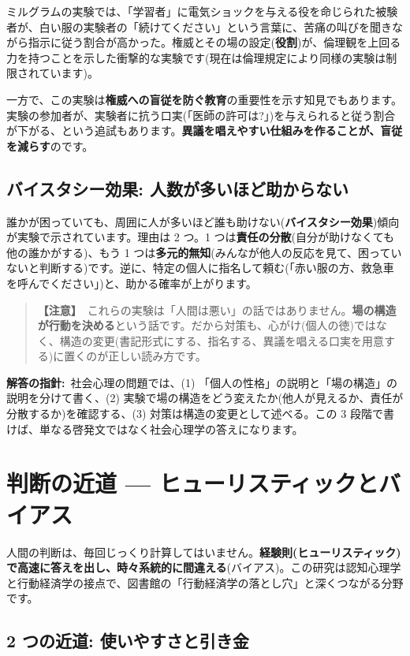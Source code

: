 \documentclass{article}
\begin{document}
ミルグラムの実験では、「学習者」に電気ショックを与える役を命じられた被験者が、白い服の実験者の「続けてください」という言葉に、苦痛の叫びを聞きながら指示に従う割合が高かった。権威とその場の設定(\textbf{役割})が、倫理観を上回る力を持つことを示した衝撃的な実験です(現在は倫理規定により同様の実験は制限されています)。

一方で、この実験は\textbf{権威への盲従を防ぐ教育}の重要性を示す知見でもあります。実験の参加者が、実験者に抗う口実(「医師の許可は?」)を与えられると従う割合が下がる、という追試もあります。\textbf{異議を唱えやすい仕組みを作ることが、盲従を減らす}のです。

\subsection{バイスタシー効果: 人数が多いほど助からない}

誰かが困っていても、周囲に人が多いほど誰も助けない(\textbf{バイスタシー効果})傾向が実験で示されています。理由は 2 つ。1 つは\textbf{責任の分散}(自分が助けなくても他の誰かがする)、もう 1 つは\textbf{多元的無知}(みんなが他人の反応を見て、困っていないと判断する)です。逆に、特定の個人に指名して頼む(「赤い服の方、救急車を呼んでください」)と、助かる確率が上がります。

\begin{quote}
\textbf{【注意】}\ これらの実験は「人間は悪い」の話ではありません。\textbf{場の構造が行動を決める}という話です。だから対策も、心がけ(個人の徳)ではなく、構造の変更(書記形式にする、指名する、異議を唱える口実を用意する)に置くのが正しい読み方です。
\end{quote}

\textbf{解答の指針:}\ 社会心理の問題では、(1) 「個人の性格」の説明と「場の構造」の説明を分けて書く、(2) 実験で場の構造をどう変えたか(他人が見えるか、責任が分散するか)を確認する、(3) 対策は構造の変更として述べる。この 3 段階で書けば、単なる啓発文ではなく社会心理学の答えになります。

\section{判断の近道 — ヒューリスティックとバイアス}

人間の判断は、毎回じっくり計算してはいません。\textbf{経験則(ヒューリスティック)で高速に答えを出し、時々系統的に間違える}(バイアス)。この研究は認知心理学と行動経済学の接点で、図書館の「行動経済学の落とし穴」と深くつながる分野です。

\subsection{2 つの近道: 使いやすさと引き金}
\end{document}
